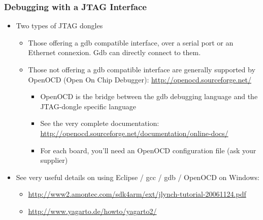 \begin{frame}
  \frametitle{Debugging with a JTAG Interface}
  \begin{itemize}
  \item Two types of JTAG dongles
    \begin{itemize}
    \item Those offering a gdb compatible interface, over a serial
      port or an Ethernet connexion. Gdb can directly connect to them.
    \item Those not offering a gdb compatible interface are generally
      supported by OpenOCD (Open On Chip Debugger):
      \url{http://openocd.sourceforge.net/}
      \begin{itemize}
      \item OpenOCD is the bridge between the gdb debugging language
        and the JTAG-dongle specific language
      \item See the very complete documentation:
        \url{http://openocd.sourceforge.net/documentation/online-docs/}
      \item For each board, you'll need an OpenOCD configuration file
        (ask your supplier)
      \end{itemize}
    \end{itemize}
  \item See very useful details on using Eclipse / gcc / gdb / OpenOCD
    on Windows:
    \begin{itemize}
    \item \url{http://www2.amontec.com/sdk4arm/ext/jlynch-tutorial-20061124.pdf}
    \item \url{http://www.yagarto.de/howto/yagarto2/}
    \end{itemize}
  \end{itemize}
\end{frame}

